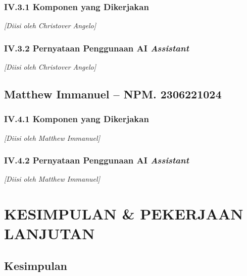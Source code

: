 \documentclass[11pt,a4paper,oneside]{report}
\begin{document}
\subsection*{IV.3.1 Komponen yang Dikerjakan}
\textit{[Diisi oleh Christover Angelo]}

\subsection*{IV.3.2 Pernyataan Penggunaan AI \textit{Assistant}}
\textit{[Diisi oleh Christover Angelo]}

\section{Matthew Immanuel -- NPM. 2306221024}

\subsection*{IV.4.1 Komponen yang Dikerjakan}
\textit{[Diisi oleh Matthew Immanuel]}

\subsection*{IV.4.2 Pernyataan Penggunaan AI \textit{Assistant}}
\textit{[Diisi oleh Matthew Immanuel]}

\chapter{KESIMPULAN \& PEKERJAAN LANJUTAN}
\label{bab:kesimpulan}

\section{Kesimpulan}
\end{document}

